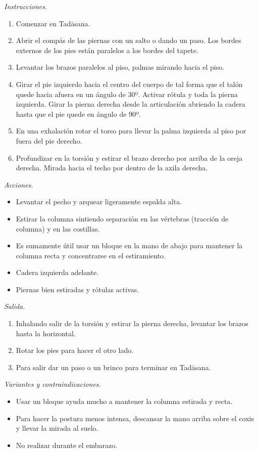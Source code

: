 \emph{Instrucciones.}
\begin{enumerate}
\item Comenzar en Tadāsana.
\item Abrir el compás de las piernas con un
salto o dando un paso. Los bordes externos de
los pies están paralelos a los bordes del
tapete.
\item Levantar los brazos paralelos al piso,
palmas mirando hacia el piso.
\item Girar el pie izquierdo hacia el centro
del cuerpo de tal forma que el talón quede
hacia afuera en un ángulo de 30º. Activar
rótula y toda la pierna izquierda. Girar la
pierna derecha desde la articulación abriendo
la cadera hasta que el pie quede en ángulo de
90º.
\item En una exhalación rotar el torso para
llevar la palma izquierda al piso por fuera
del pie derecho.
\item Profundizar en la torsión y estirar el
brazo derecho por arriba de la oreja derecha.
Mirada hacia el techo por dentro de la axila
derecha.
\end{enumerate}

\emph{Acciones.}
\begin{itemize}
\item Levantar el pecho y arquear ligeramente
espalda alta.
\item Estirar la columna sintiendo separación
en las vértebras (tracción de columna) y en
las costillas.
\item Es sumamente útil usar un bloque en la
mano de abajo para mantener la columna recta
y concentrarse en el estiramiento.
\item Cadera izquierda adelante.
\item Piernas bien estiradas y rótulas
activas.
\end{itemize}

\emph{Salida.}
\begin{enumerate}
\item Inhalando salir de la torsión y estirar
la pierna derecha, levantar los brazos hasta
la horizontal.
\item Rotar los pies para hacer el otro lado.
\item Para salir dar un paso o un brinco para
terminar en Tadāsana.
\end{enumerate}

\emph{Variantes y contraindicaciones.}
\begin{itemize}
\item Usar un bloque ayuda mucho a mantener
la columna estirada y recta.
\item Para hacer la postura menos intensa,
descansar la mano arriba sobre el coxis y
llevar la mirada al suelo.
\item No realizar durante el embarazo.
\end{itemize}

